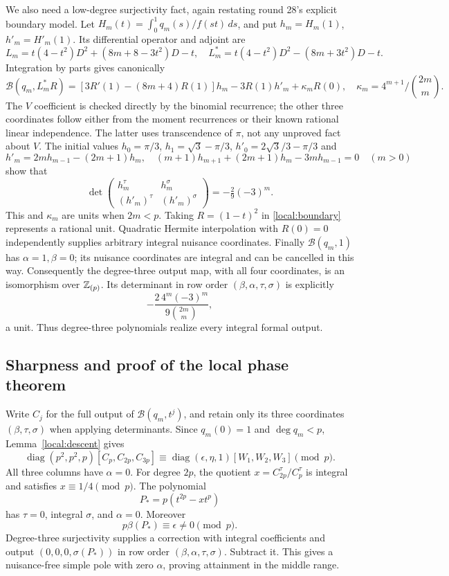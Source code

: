 \documentclass[11pt,a4paper]{article}
\numberwithin{equation}{section}
\theoremstyle{definition}\newtheorem{definition}[theorem]{Definition}
\theoremstyle{remark}\newtheorem{remark}[theorem]{Remark}
\newcommand{\B}{\mathcal B}\newcommand{\N}{\mathcal N}\newcommand{\M}{\mathcal M}
\begin{document}
We also need a low-degree surjectivity fact, again restating round 28's explicit boundary model. Let $H_m(t)=\int_0^1q_m(s)/f(st)\,ds$, and put $h_m=H_m(1)$, $h'_m=H'_m(1)$. Its differential operator and adjoint are
\[
 L_m=t(4-t^2)D^2+(8m+8-3t^2)D-t,\quad
 L_m^*=t(4-t^2)D^2-(8m+3t^2)D-t.
\]
Integration by parts gives canonically
\begin{equation}\label{local:boundary}
 \B(q_m,L_m^*R)=[3R'(1)-(8m+4)R(1)]h_m-3R(1)h'_m+\kappa_mR(0),\quad
 \kappa_m=4^{m+1}/\binom{2m}m.
\end{equation}
The $V$ coefficient is checked directly by the binomial recurrence; the other three coordinates follow either from the moment recurrences or their known rational linear independence. The latter uses transcendence of $\pi$, not any unproved fact about $V$.
The initial values $h_0=\pi/3$, $h_1=\sqrt3-\pi/3$, $h'_0=2\sqrt3/3-\pi/3$ and
\[
 h'_m=2mh_{m-1}-(2m+1)h_m,\quad
 (m+1)h_{m+1}+(2m+1)h_m-3mh_{m-1}=0\quad(m>0)
\]
show that
\[
 \det\begin{pmatrix}h_m^\tau&h_m^\sigma\\(h'_m)^\tau&(h'_m)^\sigma\end{pmatrix}
                 =-\tfrac29(-3)^m.
\]
This and $\kappa_m$ are units when $2m<p$. Taking $R=(1-t)^2$ in \eqref{local:boundary} represents a rational unit. Quadratic Hermite interpolation with $R(0)=0$ independently supplies arbitrary integral nuisance coordinates. Finally $\B(q_m,1)$ has $\alpha=1,\beta=0$; its nuisance coordinates are integral and can be cancelled in this way. Consequently the degree-three output map, with all four coordinates, is an isomorphism over $\mathbb Z_{(p)}$. Its determinant in row order $(\beta,\alpha,\tau,\sigma)$ is explicitly
\[
                        -\frac{2\,4^m(-3)^m}{9\binom{2m}m},
\]
a unit. Thus degree-three polynomials realize every integral formal output.

\subsection{Sharpness and proof of the local phase theorem}
Write $C_j$ for the full output of $\B(q_m,t^j)$, and retain only its three coordinates $(\beta,\tau,\sigma)$ when applying determinants. Since $q_m(0)=1$ and $\deg q_m<p$, Lemma~\ref{local:descent} gives
\begin{equation}\label{local:high}
 \operatorname{diag}(p^2,p^2,p)[C_p,C_{2p},C_{3p}]
       \equiv\operatorname{diag}(\epsilon,\eta,1)[W_1,W_2,W_3]\pmod p.
\end{equation}
All three columns have $\alpha=0$.
For degree $2p$, the quotient $x=C_{2p}^\tau/C_p^\tau$ is integral and satisfies $x\equiv1/4\pmod p$. The polynomial
\[
                           P_*=p(t^{2p}-x t^p)
\]
has $\tau=0$, integral $\sigma$, and $\alpha=0$. Moreover
\[
                           p\beta(P_*)\equiv\epsilon\ne0\pmod p.
\]
Degree-three surjectivity supplies a correction with integral coefficients and output $(0,0,0,\sigma(P_*))$ in row order $(\beta,\alpha,\tau,\sigma)$. Subtract it. This gives a nuisance-free simple pole with zero $\alpha$, proving attainment in the middle range.
\end{document}
